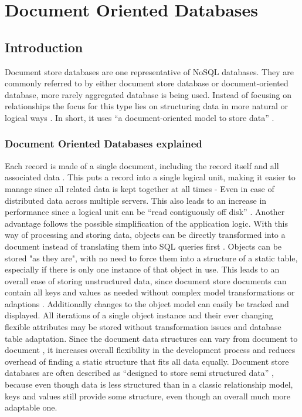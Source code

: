 \chapter{Document Oriented Databases}
\section{Introduction}
Document store databases are one representative of NoSQL databases. They are commonly referred to by either document store database or document-oriented database, more rarely aggregated database is being used. Instead of focusing on relationships the focus for this type lies on structuring data in more natural or logical ways \parencite{mongodb2019}. In short, it uses “a document-oriented model to store data” \parencite{ian2016}. 

\subsection{Document Oriented Databases explained}
Each record is made of a single document, including the record itself and all associated data \parencite{ian2016}\parencite{amazonNoSql}. This puts a record into a single logical unit, making it easier to manage since all related data is kept together at all times - Even in case of distributed data across multiple servers. This also leads to an increase in performance since a logical unit can be “read contiguously off disk” \parencite{mongodb2019}. Another advantage follows the possible simplification of the application logic. With this way of processing and storing data, objects can be directly transformed into a document instead of translating them into SQL queries first \parencite{mongodb2019}  \parencite{amazonNoSql}. Objects can be stored "as they are", with no need to force them into a structure of a static table, especially if there is only one instance of that object in use. This leads to an overall ease of storing unstructured data, since document store documents can contain all keys and values as needed without complex model transformations or adaptions \parencite{mongodb2019}. Additionally changes to the object model can easily be tracked and displayed. All iterations of a single object instance and their ever changing flexible attributes may be stored without transformation issues and database table adaptation. Since the document data structures can vary from document to document  \parencite{amazonNoSql}, it increases overall flexibility in the development process and reduces overhead of finding a static structure that fits all data equally. Document store databases are often described as “designed to store semi structured data”  \parencite{amazonNoSql}, because even though data is less structured than in a classic relationship model, keys and values still provide some structure, even though an overall much more adaptable one.

